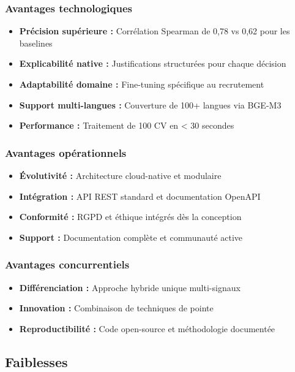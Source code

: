 \documentclass[12pt,a4paper]{report}
\begin{document}
\subsubsection{Avantages technologiques}

\begin{itemize}
\item \textbf{Précision supérieure :} Corrélation Spearman de 0,78 vs 0,62 pour les baselines
\item \textbf{Explicabilité native :} Justifications structurées pour chaque décision
\item \textbf{Adaptabilité domaine :} Fine-tuning spécifique au recrutement
\item \textbf{Support multi-langues :} Couverture de 100+ langues via BGE-M3
\item \textbf{Performance :} Traitement de 100 CV en < 30 secondes
\end{itemize}

\subsubsection{Avantages opérationnels}

\begin{itemize}
\item \textbf{Évolutivité :} Architecture cloud-native et modulaire
\item \textbf{Intégration :} API REST standard et documentation OpenAPI
\item \textbf{Conformité :} RGPD et éthique intégrés dès la conception
\item \textbf{Support :} Documentation complète et communauté active
\end{itemize}

\subsubsection{Avantages concurrentiels}

\begin{itemize}
\item \textbf{Différenciation :} Approche hybride unique multi-signaux
\item \textbf{Innovation :} Combinaison de techniques de pointe
\item \textbf{Reproductibilité :} Code open-source et méthodologie documentée
\end{itemize}

\subsection{Faiblesses}
\end{document}
